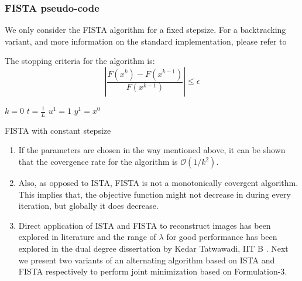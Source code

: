 \subsubsection{FISTA pseudo-code}

We only consider the FISTA algorithm for a fixed stepsize. 
For a backtracking variant, and more information on the standard implementation, please
refer to \cite{FISTA}

The stopping criteria for the algorithm is:
\begin{equation}
 \left| \frac{F(x^k) - F(x^{k-1})}{F(x^{k-1})} \right| \leq \epsilon
\end{equation}

\vspace{5pt}
\begin{algorithm}[H]
 $k = 0 $ \;
 $t = \frac{1}{L}$ \;
 $u^1 = 1 $ \;
 $y^1 = x^0$ \;
 
 
 
 \caption{FISTA with constant stepsize}
\end{algorithm}

\begin{enumerate}
 \item If the parameters are chosen in the way mentioned above, it can be shown that the covergence rate for the
 algorithm is $\mathcal{O}(1/k^2)$. \cite{FISTA}
 \item Also, as opposed to ISTA, FISTA is not a monotonically covergent algorithm.
 This implies that, the objective function might not decrease in during every iteration, but globally it does decrease.
\item Direct application of ISTA and FISTA to reconstruct images has been explored in literature and the range of $\lambda$ for good performance has been explored in the dual degree dissertation by Kedar Tatwawadi, IIT B \cite{kedar_report}. Next we present two variants of an alternating algorithm based on ISTA and FISTA respectively to perform joint minimization based on {Formulation-3}.
\end{enumerate}


